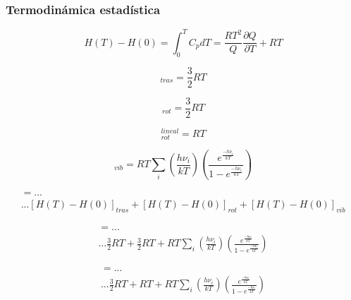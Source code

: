 \documentclass{beamer}
\begin{document}
\begin{frame}[fragile]
\frametitle{Termodinámica estadística}

\begin{equation}
H(T)-H(0) = \int_{0} ^{T} C_{p} dT = \frac{RT^{2}}{Q} \frac{\partial Q}{\partial T} + RT
\label{eq:3.26}
\end{equation}



\begin{equation}
[H(T)-H(0)]_{tras} = \mathrm{\frac{3}{2}} RT
\label{eq:3.28}
\end{equation}

\begin{equation}
[H(T)-H(0)]_{rot} = \mathrm{\frac{3}{2}} RT
\label{eq:3.29}
\end{equation}


\begin{equation}
[H(T)-H(0)]_{rot}^{lineal} =  RT
\label{eq:3.30}
\end{equation}

\begin{equation}
[H(T)-H(0)]_{vib}=RT \sum_i \left(\frac{h\nu_i}{kT}\right)\left(\frac{e^{\frac{-h\nu_i}{kT}}}{1-e^{\frac{-h\nu_i}{kT}}}\right)
\label{eq:3.31}
\end{equation}
\end{frame}

\begin{frame}[fragile]


\begin{multline}
[H(298.15)-H(0)] =... \\... [H(T)-H(0)]_{tras}+[H(T)-H(0)]_{rot}+[H(T)-H(0)]_{vib}
\end{multline}


\begin{multline}
[H(298.15)-H(0)] =... \\... \mathrm{\frac{3}{2}} RT+ \mathrm{\frac{3}{2}} RT + RT \sum_i \left(\frac{h\nu_i}{kT}\right)\left(\frac{e^{\frac{-h\nu_i}{kT}}}{1-e^{\frac{-h\nu_i}{kT}}}\right)
\end{multline}

\begin{multline}
[H(298.15)-H(0)] =... \\... \mathrm{\frac{3}{2}} RT+  RT + RT \sum_i \left(\frac{h\nu_i}{kT}\right)\left(\frac{e^{\frac{-h\nu_i}{kT}}}{1-e^{\frac{-h\nu_i}{kT}}}\right)
\end{multline}

\end{frame}
\end{document}

